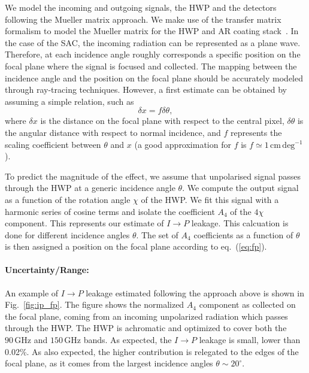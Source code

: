 We model the incoming and outgoing signals, the HWP and the detectors following the Mueller matrix approach. We make use of the transfer matrix formalism to model the Mueller matrix for the HWP and AR coating stack~\cite{Essinger-Hileman_TM}. In the case of the SAC, the incoming radiation can be represented as a plane wave. Therefore, at each incidence angle roughly corresponds a specific position on the focal plane where the signal is focused and collected. The mapping between the incidence angle and the position on the focal plane should be accurately modeled through ray-tracing techniques. However, a first estimate can be obtained by assuming a simple relation, such as 
\begin{equation}\label{eq:fp}
\delta x= f \delta \theta,
\end{equation}
where $\delta x$ is the distance on the focal plane with respect to the central pixel, $\delta \theta$ is the angular distance with respect to normal incidence, and $f$ represents the scaling coefficient between $\theta$ and $x$ (a good approximation for $f$ is $f\simeq 1\,\mathrm{cm\,deg^{-1}}$).

To predict the magnitude of the effect, we assume that unpolarised signal passes through the HWP at a generic incidence angle $\theta$. We compute the output signal as a function of the rotation angle $\chi$ of the HWP. We fit this signal with a harmonic series of cosine terms and isolate the coefficient $A_4$ of the $4\chi$ component. This represents our estimate of $I\rightarrow P$ leakage. This calcuation is done for different incidence angles $\theta$. The set of $A_4$ coefficients as a function of $\theta$ is then assigned a position on the focal plane according to eq.~(\ref{eq:fp}).

\paragraph{Uncertainty/Range:}
An example of $I\rightarrow P$ leakage estimated following the approach above is shown in Fig.~\ref{fig:ip_fp}. The figure shows the normalized $A_4$ component as collected on the focal plane, coming from an incoming unpolarized radiation which passes through the HWP. The HWP is achromatic and optimized to cover both the $90\,\mathrm{GHz}$ and $150\,\mathrm{GHz}$ bands. As expected, the $I\rightarrow P$ leakage is small, lower than 0.02\%. As also expected, the higher contribution is relegated to the edges of the focal plane, as it comes from the largest incidence angles $\theta\sim 20^\circ$.

